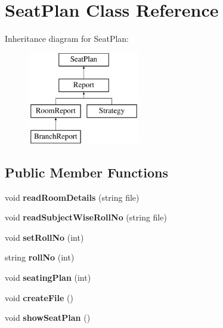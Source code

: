\hypertarget{classSeatPlan}{\section{Seat\-Plan Class Reference}
\label{classSeatPlan}
}
Inheritance diagram for Seat\-Plan\-:\begin{figure}[H]
\begin{center}
\leavevmode
\includegraphics[height=4.000000cm]{classSeatPlan}
\end{center}
\end{figure}
\subsection*{Public Member Functions}
\begin{DoxyCompactItemize}
\item 
\hypertarget{classSeatPlan_af0b793e791818a925f5165eae35085aa}{void {\bfseries read\-Room\-Details} (string file)}\label{classSeatPlan_af0b793e791818a925f5165eae35085aa}

\item 
\hypertarget{classSeatPlan_ada3dbbc8860edafce4b2ba96b1862d67}{void {\bfseries read\-Subject\-Wise\-Roll\-No} (string file)}\label{classSeatPlan_ada3dbbc8860edafce4b2ba96b1862d67}

\item 
\hypertarget{classSeatPlan_a285b0e3a3334b230f26f05cf98979d81}{void {\bfseries set\-Roll\-No} (int)}\label{classSeatPlan_a285b0e3a3334b230f26f05cf98979d81}

\item 
\hypertarget{classSeatPlan_a954020587c5c7d09b00d8129e37015e3}{string {\bfseries roll\-No} (int)}\label{classSeatPlan_a954020587c5c7d09b00d8129e37015e3}

\item 
\hypertarget{classSeatPlan_a68510ad9fdc8570cc80a69b51a8c5973}{void {\bfseries seating\-Plan} (int)}\label{classSeatPlan_a68510ad9fdc8570cc80a69b51a8c5973}

\item 
\hypertarget{classSeatPlan_ab2723653cf69967b512cbf9f996eb1ea}{void {\bfseries create\-File} ()}\label{classSeatPlan_ab2723653cf69967b512cbf9f996eb1ea}

\item 
\hypertarget{classSeatPlan_a6b237e82222d333c0ddf43a9e86a2136}{void {\bfseries show\-Seat\-Plan} ()}\label{classSeatPlan_a6b237e82222d333c0ddf43a9e86a2136}

\end{DoxyCompactItemize}
